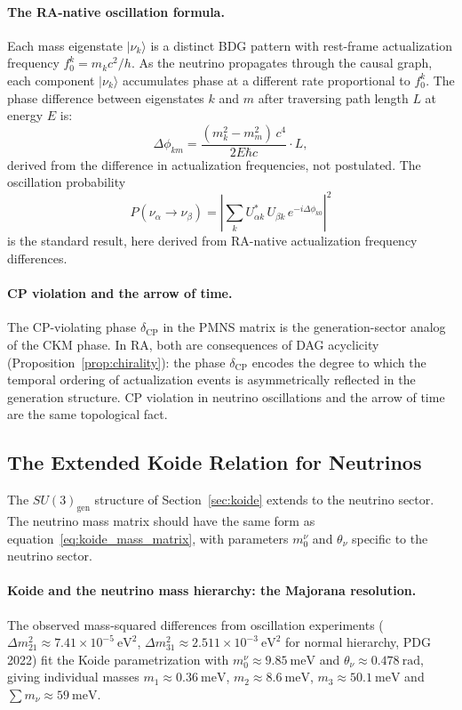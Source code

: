 \documentclass[11pt,a4paper]{article}
\begin{document}
\paragraph{The RA-native oscillation formula.}
Each mass eigenstate $|\nu_k\rangle$ is a distinct BDG pattern with
rest-frame actualization frequency $f_0^k = m_k c^2/h$. As the neutrino
propagates through the causal graph, each component $|\nu_k\rangle$
accumulates phase at a different rate proportional to $f_0^k$. The
phase difference between eigenstates $k$ and $m$ after traversing
path length $L$ at energy $E$ is:
\begin{equation}
  \Delta\phi_{km} = \frac{(m_k^2 - m_m^2)\,c^4}{2E\hbar c} \cdot L,
  \label{eq:osc_phase}
\end{equation}
derived from the difference in actualization frequencies, not postulated.
The oscillation probability
\begin{equation}
  P(\nu_\alpha \to \nu_\beta) = \left|\sum_k U_{\alpha k}^*\,U_{\beta k}\,
  e^{-i\Delta\phi_{k0}}\right|^2
  \label{eq:osc_prob}
\end{equation}
is the standard result, here derived from RA-native actualization frequency
differences.

\paragraph{CP violation and the arrow of time.}
The CP-violating phase $\delta_{\mathrm{CP}}$ in the PMNS matrix is the
generation-sector analog of the CKM phase. In RA, both are consequences of
DAG acyclicity (Proposition~\ref{prop:chirality}): the phase $\delta_{\mathrm{CP}}$
encodes the degree to which the temporal ordering of actualization events is
asymmetrically reflected in the generation structure. CP violation in neutrino
oscillations and the arrow of time are the same topological fact.

\subsection{The Extended Koide Relation for Neutrinos}

The $SU(3)_{\mathrm{gen}}$ structure of Section~\ref{sec:koide} extends to
the neutrino sector. The neutrino mass matrix should have the same form
as equation~\eqref{eq:koide_mass_matrix}, with parameters
$m_0^\nu$ and $\theta_\nu$ specific to the neutrino sector.

\paragraph{Koide and the neutrino mass hierarchy: the Majorana resolution.}
The observed mass-squared differences from oscillation experiments
($\Delta m^2_{21} \approx 7.41 \times 10^{-5}~\text{eV}^2$,
$\Delta m^2_{31} \approx 2.511 \times 10^{-3}~\text{eV}^2$ for normal hierarchy,
PDG 2022) fit the Koide parametrization with $m_0^\nu \approx 9.85~\text{meV}$ and
$\theta_\nu \approx 0.478~\text{rad}$, giving individual masses
$m_1 \approx 0.36~\text{meV}$, $m_2 \approx 8.6~\text{meV}$,
$m_3 \approx 50.1~\text{meV}$ and $\sum m_\nu \approx 59~\text{meV}$.
\end{document}

